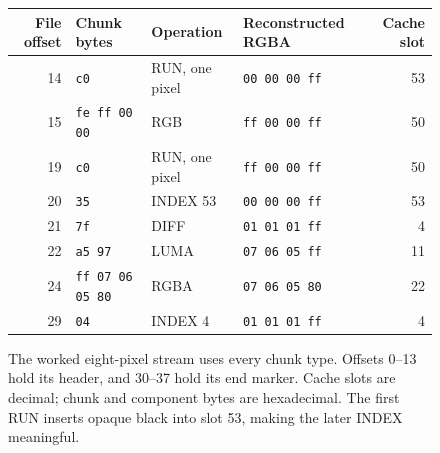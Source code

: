 \begin{figure}[htbp]
  \centering
  \begin{tabular}{r l l l r}
    \toprule
    File offset & Chunk bytes             & Operation      & Reconstructed RGBA   & Cache slot \\
    \midrule
    14          & \texttt{c0}             & RUN, one pixel & \texttt{00 00 00 ff} & 53         \\
    15          & \texttt{fe ff 00 00}    & RGB            & \texttt{ff 00 00 ff} & 50         \\
    19          & \texttt{c0}             & RUN, one pixel & \texttt{ff 00 00 ff} & 50         \\
    20          & \texttt{35}             & INDEX 53       & \texttt{00 00 00 ff} & 53         \\
    21          & \texttt{7f}             & DIFF           & \texttt{01 01 01 ff} & 4          \\
    22          & \texttt{a5 97}          & LUMA           & \texttt{07 06 05 ff} & 11         \\
    24          & \texttt{ff 07 06 05 80} & RGBA           & \texttt{07 06 05 80} & 22         \\
    29          & \texttt{04}             & INDEX 4        & \texttt{01 01 01 ff} & 4          \\
    \bottomrule
  \end{tabular}
  \caption{The worked eight-pixel stream uses every chunk type. Offsets 0--13 hold its header, and 30--37 hold its end marker. Cache slots are decimal; chunk and component bytes are hexadecimal. The first RUN inserts opaque black into slot 53, making the later INDEX meaningful.}
  \label{fig:revision-qoi-trace}
\end{figure}
